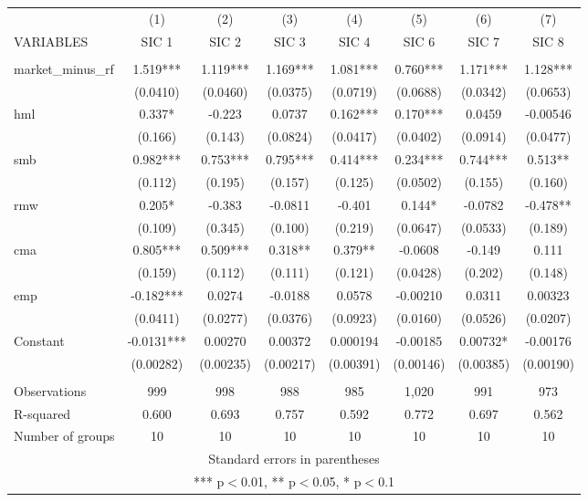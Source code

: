 \begin{tabular}{lccccccc} \hline
 & (1) & (2) & (3) & (4) & (5) & (6) & (7) \\
VARIABLES & SIC 1 & SIC 2 & SIC 3 & SIC 4 & SIC 6 & SIC 7 & SIC 8 \\ \hline
 &  &  &  &  &  &  &  \\
market\_minus\_rf & 1.519*** & 1.119*** & 1.169*** & 1.081*** & 0.760*** & 1.171*** & 1.128*** \\
 & (0.0410) & (0.0460) & (0.0375) & (0.0719) & (0.0688) & (0.0342) & (0.0653) \\
hml & 0.337* & -0.223 & 0.0737 & 0.162*** & 0.170*** & 0.0459 & -0.00546 \\
 & (0.166) & (0.143) & (0.0824) & (0.0417) & (0.0402) & (0.0914) & (0.0477) \\
smb & 0.982*** & 0.753*** & 0.795*** & 0.414*** & 0.234*** & 0.744*** & 0.513** \\
 & (0.112) & (0.195) & (0.157) & (0.125) & (0.0502) & (0.155) & (0.160) \\
rmw & 0.205* & -0.383 & -0.0811 & -0.401 & 0.144* & -0.0782 & -0.478** \\
 & (0.109) & (0.345) & (0.100) & (0.219) & (0.0647) & (0.0533) & (0.189) \\
cma & 0.805*** & 0.509*** & 0.318** & 0.379** & -0.0608 & -0.149 & 0.111 \\
 & (0.159) & (0.112) & (0.111) & (0.121) & (0.0428) & (0.202) & (0.148) \\
emp & -0.182*** & 0.0274 & -0.0188 & 0.0578 & -0.00210 & 0.0311 & 0.00323 \\
 & (0.0411) & (0.0277) & (0.0376) & (0.0923) & (0.0160) & (0.0526) & (0.0207) \\
Constant & -0.0131*** & 0.00270 & 0.00372 & 0.000194 & -0.00185 & 0.00732* & -0.00176 \\
 & (0.00282) & (0.00235) & (0.00217) & (0.00391) & (0.00146) & (0.00385) & (0.00190) \\
 &  &  &  &  &  &  &  \\
Observations & 999 & 998 & 988 & 985 & 1,020 & 991 & 973 \\
R-squared & 0.600 & 0.693 & 0.757 & 0.592 & 0.772 & 0.697 & 0.562 \\
 Number of groups & 10 & 10 & 10 & 10 & 10 & 10 & 10 \\ \hline
\multicolumn{8}{c}{ Standard errors in parentheses} \\
\multicolumn{8}{c}{ *** p$<$0.01, ** p$<$0.05, * p$<$0.1} \\
\end{tabular}
